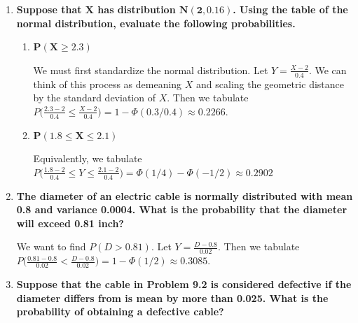\documentclass[10pt, oneside]{article}
\begin{document}
\begin{enumerate}[label=9.\arabic*]
\itemsep0em 
\item  \begin{tcolorbox}[
  colback=Cerulean!5!white,
  colframe=Cerulean!75!black]
\textbf{Suppose that $\bm{X}$ has distribution $\bm{N(2, 0.16)}$. Using the table of the normal distribution, evaluate the following probabilities.}
\end{tcolorbox}

	\begin{enumerate}
	\item  \begin{tcolorbox}[
	  colback=Cerulean!5!white,
	  colframe=Cerulean!75!black]
	\textbf{$\bm{P(X \geq 2.3)}$}
	\end{tcolorbox}
	
	We must first standardize the normal distribution. Let $Y = \frac{X - 2}{0.4}$. We can think of this process as demeaning $X$ and scaling the geometric distance by the standard deviation of $X$. Then we tabulate $P\Big( \frac{2.3-2}{0.4} \leq \frac{X-2}{0.4} \Big) = 1 - \Phi(0.3/0.4) \approx \boxed{0.2266}$.  
	
	\item  \begin{tcolorbox}[
	  colback=Cerulean!5!white,
	  colframe=Cerulean!75!black]
	\textbf{$\bm{P(1.8 \leq X \leq 2.1)}$}
	\end{tcolorbox}
	
	Equivalently, we tabulate $P \Big( \frac{1.8-2}{0.4} \leq Y \leq \frac{2.1-2}{0.4} \Big) = \Phi(1/4) - \Phi(-1/2) \approx \boxed{0.2902}$
	
	\end{enumerate}

\item  \begin{tcolorbox}[
  colback=Cerulean!5!white,
  colframe=Cerulean!75!black]
\textbf{The diameter of an electric cable is normally distributed with mean 0.8 and variance 0.0004. What is the probability that the diameter will exceed 0.81 inch?}
\end{tcolorbox}

We want to find $P(D > 0.81)$. Let $Y = \frac{D - 0.8}{0.02}$. Then we tabulate $P\Big( \frac{0.81 - 0.8}{0.02} < \frac{D - 0.8}{0.02} \Big) = 1 - \Phi(1/2) \approx \boxed{0.3085}$.

\item  \begin{tcolorbox}[
  colback=Cerulean!5!white,
  colframe=Cerulean!75!black]
\textbf{Suppose that the cable in Problem 9.2 is considered defective if the diameter differs from is mean by more than 0.025. What is the probability of obtaining a defective cable?}
\end{tcolorbox}


\end{enumerate}
\end{document}
